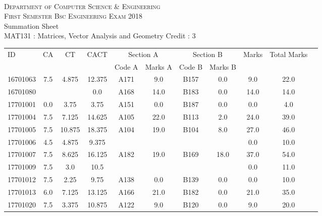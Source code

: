 \documentclass[12pt]{article}
\begin{document}
    \centering
    \begin{minipage}[m]{.8\textwidth} \centering 
	\smallskip
	\\
	\textsc{Department of Computer Science \& Engineering}\\
	\textsc{ First Semester Bsc Engineering Exam 2018}\\
    {\large {\sc Summation Sheet}}\\  
     {\centering MAT131 : Matrices, Vector Analysis and Geometry     Credit : 3 } \\
    \end{minipage} 
    \begin{center} 
	\renewcommand{\arraystretch}{1.08}
	\begin{small}
    \begin{tabular}{|l|c|c|c|c|c|c|c|c|c|c|} \hline
	\multirow{2}{*}{ID} & 	\multirow{2}{*}{CA}  & 	\multirow{2}{*}{CT}  & 	\multirow{2}{*}{CACT}  & \multicolumn{2 }{c|}{Section A}& \multicolumn{2 }{c|}{Section B} & 	\multirow{2}{*}{Marks}  & 	\multirow{2}{*}{Total Marks}  \\ 
	&  &  &  & Code A & Marks A & Code B & Marks B&  &  \\ \hline
16701063 & 7.5 & 4.875 & 12.375 & A171 & 9.0 & B157 & 0.0 & 9.0 & 22.0\\ \hline 
16701080 &  &  & 0.0 & A168 & 14.0 & B183 & 0.0 & 14.0 & 14.0\\ \hline 
17701001 & 0.0 & 3.75 & 3.75 & A151 & 0.0 & B187 & 0.0 & 0.0 & 4.0\\ \hline 
17701004 & 7.5 & 7.125 & 14.625 & A105 & 22.0 & B113 & 2.0 & 24.0 & 39.0\\ \hline 
17701005 & 7.5 & 10.875 & 18.375 & A104 & 19.0 & B104 & 8.0 & 27.0 & 46.0\\ \hline 
17701006 & 4.5 & 4.875 & 9.375 &  &  &  &  & 0.0 & 10.0\\ \hline 
17701007 & 7.5 & 8.625 & 16.125 & A182 & 19.0 & B169 & 18.0 & 37.0 & 54.0\\ \hline 
17701009 & 7.5 & 3.0 & 10.5 &  &  &  &  & 0.0 & 11.0\\ \hline 
17701012 & 7.5 & 2.25 & 9.75 & A138 & 0.0 & B139 & 0.0 & 0.0 & 10.0\\ \hline 
17701013 & 6.0 & 7.125 & 13.125 & A166 & 21.0 & B182 & 0.0 & 21.0 & 35.0\\ \hline 
17701020 & 7.5 & 3.375 & 10.875 & A122 & 9.0 & B120 & 0.0 & 9.0 & 20.0\\ \hline 

\end{tabular}
\end{small}
\end{center}
\end{document}
